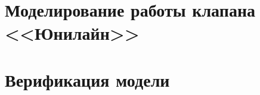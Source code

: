\section{Моделирование работы клапана <<Юнилайн>>} \label{sect3_2}

\section{Верификация модели} \label{sect3_3}

\clearpage
